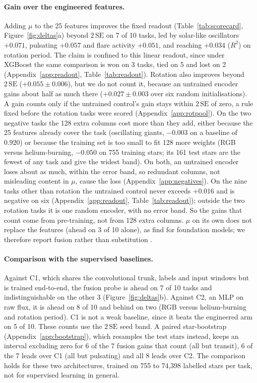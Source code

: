 \documentclass{article}
\begin{document}
\paragraph{Gain over the engineered features.} Adding $\mu$ to the 25 features
improves the fixed readout (Table~\ref{tab:scorecard}, Figure~\ref{fig:deltas}a) beyond $2\,\mathrm{SE}$ on 7 of 10 tasks, led by solar-like oscillators $+0.071$,
pulsating $+0.057$ and flare activity $+0.051$, and reaching $+0.034$ ($R^{2}$) on rotation period.
The claim is confined to this linear readout, since under XGBoost the same comparison is won on 3
tasks, tied on 5 and lost on 2 (Appendix~\ref{app:readout}, Table~\ref{tab:readout}). Rotation also
improves beyond $2\,\mathrm{SE}$ ($+0.055 \pm 0.006$), but we do not count it, because an untrained
encoder gains about half as much there ($+0.027 \pm 0.003$ over six random initialisations). A gain
counts only if the untrained control's gain stays within $2\,\mathrm{SE}$ of zero, a rule fixed before
the rotation tasks were scored (Appendix~\ref{app:rotpool}). On the two negative tasks the 128 extra
columns cost more than they add, either because the 25 features already cover the task (oscillating
giants, $-0.003$ on a baseline of $0.920$) or because the training set is too small to fit 128 more
weights (RGB versus helium-burning, $-0.050$ on 755 training stars; its 161 test stars are the fewest
of any task and give the widest band). On both, an untrained encoder loses about as much, within the
error band, so redundant columns, not misleading content in $\mu$, cause the loss
(Appendix~\ref{app:negatives}). On the nine tasks other than rotation the untrained control never
exceeds $+0.016$ and is negative on six
(Appendix~\ref{app:readout}, Table~\ref{tab:readout}); outside the two rotation tasks it is one random encoder, with no error
band. So the gains that count come from
pre-training, not from 128 extra columns. $\mu$ on its own does not
replace the features (ahead on 3 of 10 alone), as \citet{li2025staremb} find for
foundation models; we therefore report fusion rather than substitution \citep{makinen2024}.

\paragraph{Comparison with the supervised baselines.} Against C1, which shares
the convolutional trunk, labels and input windows but is trained end-to-end, the fusion
probe is ahead on 7 of 10 tasks and indistinguishable on the other 3
(Figure~\ref{fig:deltas}b). Against
C2, an MLP on raw flux, it is ahead on 8 of 10 and behind on two (RGB versus helium-burning and
rotation period). C1 is not a weak baseline, since it beats the engineered arm on 5 of 10.
These counts use the $2\,\mathrm{SE}$ seed band. A paired star-bootstrap
(Appendix~\ref{app:bootstrap}), which resamples the test stars instead, keeps an interval excluding
zero for 6 of the 7 fusion gains that count (all but transit), 6 of the 7 leads over C1 (all but
pulsating) and all 8 leads over C2. The comparison holds for these two architectures, trained on 755
to 74{,}398 labelled stars per task, not for supervised learning in general.
\end{document}
